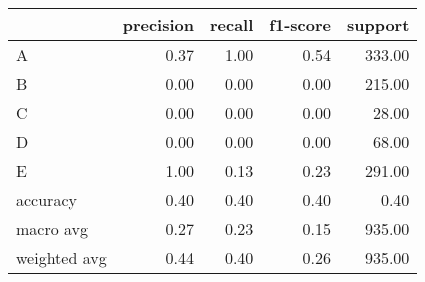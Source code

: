 \begin{tabular}{|l|r|r|r|r|}
\hline
{} &  precision &  recall &  f1-score &  support \\
\hline
A            &       0.37 &    1.00 &      0.54 &   333.00 \\
B            &       0.00 &    0.00 &      0.00 &   215.00 \\
C            &       0.00 &    0.00 &      0.00 &    28.00 \\
D            &       0.00 &    0.00 &      0.00 &    68.00 \\
E            &       1.00 &    0.13 &      0.23 &   291.00 \\
accuracy     &       0.40 &    0.40 &      0.40 &     0.40 \\
macro avg    &       0.27 &    0.23 &      0.15 &   935.00 \\
weighted avg &       0.44 &    0.40 &      0.26 &   935.00 \\
\hline
\end{tabular}
